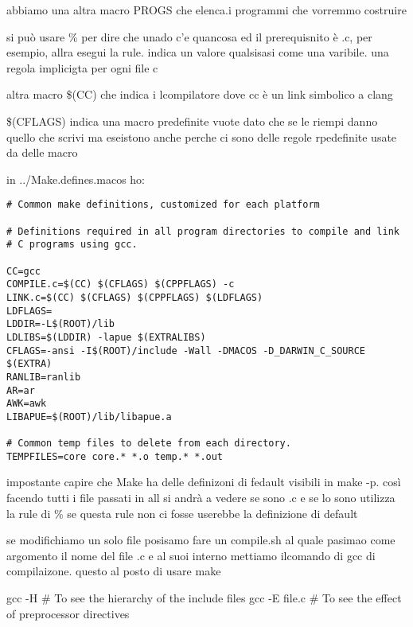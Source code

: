 abbiamo una altra macro PROGS che elenca.i programmi che vorremmo costruire

si può usare \% per dire che unado c'e quancosa ed il prerequisnito è .c, per esempio, allra esegui la rule. indica un valore qualsisasi come una varibile. una regola implicigta per ogni file c


altra macro \$(CC) che indica i lcompilatore dove cc è un link simbolico a clang

\$(CFLAGS) indica una macro predefinite vuote dato che se le riempi danno quello che scrivi ma eseistono anche perche ci sono delle regole rpedefinite usate da delle macro

in ../Make.defines.macos ho:

\begin{lstlisting}
# Common make definitions, customized for each platform

# Definitions required in all program directories to compile and link
# C programs using gcc.

CC=gcc
COMPILE.c=$(CC) $(CFLAGS) $(CPPFLAGS) -c
LINK.c=$(CC) $(CFLAGS) $(CPPFLAGS) $(LDFLAGS)
LDFLAGS=
LDDIR=-L$(ROOT)/lib
LDLIBS=$(LDDIR) -lapue $(EXTRALIBS)
CFLAGS=-ansi -I$(ROOT)/include -Wall -DMACOS -D_DARWIN_C_SOURCE $(EXTRA)
RANLIB=ranlib
AR=ar
AWK=awk
LIBAPUE=$(ROOT)/lib/libapue.a

# Common temp files to delete from each directory.
TEMPFILES=core core.* *.o temp.* *.out
\end{lstlisting}


impostante capire che Make ha delle definizoni di fedault visibili in make -p. così facendo tutti i file passati in all si andrà a vedere se sono .c e se lo sono utilizza la rule di \% se questa rule non ci fosse userebbe la definizione di default


se modifichiamo un solo file posisamo fare un compile.sh al quale pasimao come argomento il nome del file .c e al suoi interno mettiamo ilcomando di gcc di compilaizone. questo al posto di usare make


gcc -H # To see the hierarchy of the include files
gcc -E file.c # To see the effect of preprocessor directives

